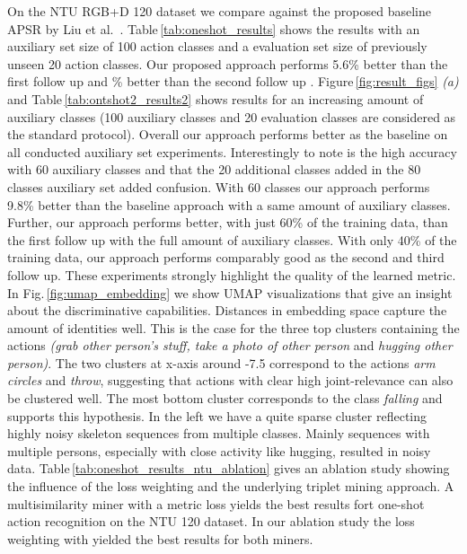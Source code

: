 \documentclass[10pt,conference,a4paper]{IEEEtran}
\def\andothers{et al.\ }
\def\figname{Fig.\,}
\def\fignamelong{Figure\,}
\def\tabname{Table\,}
\def\ntuoneshotimpro{5.6}
\begin{document}
On the NTU RGB+D 120 dataset we compare against the proposed baseline APSR by Liu \andothers \cite{liu2019ntu}. \tabname \ref{tab:oneshot_results} shows the results with an auxiliary set size of 100 action classes and a evaluation set size of previously unseen 20 action classes. Our proposed approach performs \ntuoneshotimpro\% better than the first follow up \cite{liu2019ntu} and \ntuoneshotimprosecond\% better than the second follow up \cite{liu2017skeleton}. \fignamelong \ref{fig:result_figs} \textit{(a)} and \tabname \ref{tab:ontshot2_results2} shows results for an increasing amount of auxiliary classes (100 auxiliary classes and 20 evaluation classes are considered as the standard protocol). Overall our approach performs better as the baseline on all conducted auxiliary set experiments. Interestingly to note is the high accuracy with 60 auxiliary classes and that the 20 additional classes added in the 80 classes auxiliary set added confusion. With 60 classes our approach performs 9.8\% better than the baseline approach with a same amount of auxiliary classes.
Further, our approach performs better, with just 60\% of the training data, than the first follow up with the full amount of auxiliary classes.
With only 40\% of the training data, our approach performs comparably good as the second and third follow up. These experiments strongly highlight the quality of the learned metric.
In \figname \ref{fig:umap_embedding} we show UMAP \cite{mcinnes2018umap} visualizations that give an insight about the discriminative capabilities. Distances in embedding space capture the amount of identities well. This is the case for the three top clusters containing the actions \textit{(grab other person's stuff, take a photo of other person} and \textit{hugging other person)}. The two clusters at x-axis around -7.5 correspond to the actions \textit{arm circles} and \textit{throw}, suggesting that actions with clear high joint-relevance can also be clustered well. The most bottom  cluster corresponds to the class \textit{falling} and supports this hypothesis. In the left we have a quite sparse cluster reflecting highly noisy skeleton sequences from multiple classes. Mainly sequences with multiple persons, especially with close activity like hugging, resulted in noisy data.
\tabname \ref{tab:oneshot_results_ntu_ablation} gives an ablation study showing the influence of the loss weighting and the underlying triplet mining approach. A multisimilarity miner \cite{wang2019multi} with a metric loss yields the best results fort one-shot action recognition on the NTU 120 dataset. In our ablation study the loss weighting with  yielded the best results for both miners.
\end{document}
